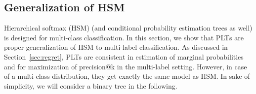 \documentclass{article}
\newcommand{\Algo}[1]{\textsc{#1}}
\newcommand{\sectionBefore}{-0pt}
\newcommand{\sectionAfter}{-0pt}
\begin{document}
\vspace{\sectionBefore}
\subsection{Generalization of HSM}
\label{sec:online_PLTs}
\vspace{\sectionAfter}

Hierarchical softmax (HSM) (and conditional probability estimation trees as well) is designed for multi-class classification. In this section, we show that \Algo{PLT}s are proper generalization of HSM to multi-label classification. As discussed in Section~\ref{sec:regret}, PLTs are consistent in estimation of marginal probabilities and for maximization of precision@k in the multi-label setting. However, in case of a multi-class distribution, they get exactly the same model as HSM. In sake of simplicity, we will consider a binary tree in the following.  
\end{document}
